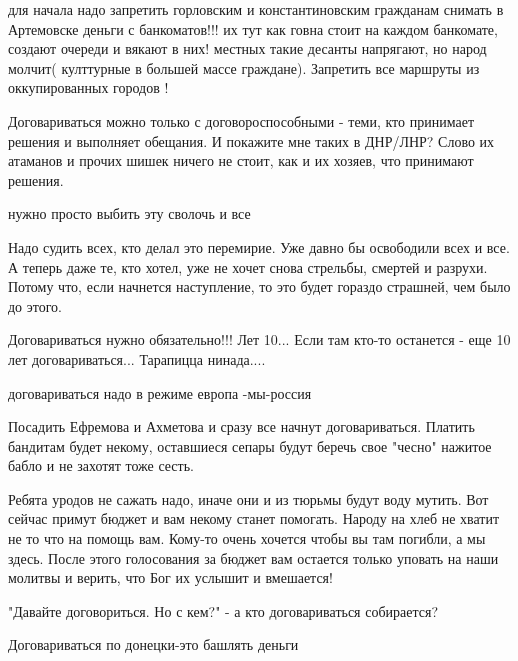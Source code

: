 \begin{itemize}

для начала надо запретить горловским и константиновским гражданам снимать в
Артемовске деньги с банкоматов!!! их тут как говна стоит на каждом банкомате,
создают очереди и вякают в них! местных такие десанты напрягают, но народ
молчит( култтурные в большей массе граждане). Запретить все маршруты из
оккупированных городов !



Договариваться можно только с договороспособными - теми, кто принимает решения
и выполняет обещания. И покажите мне таких в ДНР/ЛНР? Слово их атаманов и
прочих шишек ничего не стоит, как и их хозяев, что принимают решения.

нужно просто выбить эту сволочь и все


Надо судить всех, кто делал это перемирие. Уже давно бы освободили всех и все.
А теперь даже те, кто хотел, уже не хочет снова стрельбы, смертей и разрухи.
Потому что, если начнется наступление, то это будет гораздо страшней, чем было
до этого.


Договариваться нужно обязательно!!! Лет 10... Если там кто-то останется - еще
10 лет договариваться... Тарапицца нинада....

договариваться надо в режиме европа -мы-россия


Посадить Ефремова и Ахметова и сразу все начнут договариваться. Платить
бандитам будет некому, оставшиеся сепары будут беречь свое "чесно" нажитое
бабло и не захотят тоже сесть.


Ребята уродов не сажать надо, иначе они и из тюрьмы будут воду мутить. Вот
сейчас примут бюджет и вам некому станет помогать. Народу на хлеб не хватит не
то что на помощь вам. Кому-то очень хочется чтобы вы там погибли, а мы здесь.
После этого голосования за бюджет вам остается только уповать на наши молитвы и
верить, что Бог их услышит и вмешается!


"Давайте договориться. Но с кем?" - а кто договариваться собирается?


Договариваться по донецки-это башлять деньги



\end{itemize}
